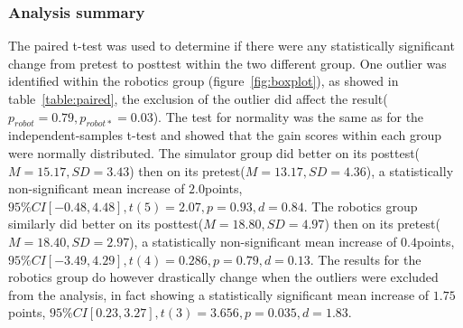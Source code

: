 \subsubsection*{Analysis summary}
The paired t-test was used to determine if there were any statistically significant change from pretest to posttest within the two different group. One outlier was identified within the robotics group (figure~\ref{fig:boxplot}), as showed in table~\ref{table:paired}, the exclusion of the outlier did affect the result($p_{robot} = 0.79, p_{robot*} = 0.03$).
The test for normality was the same as for the independent-samples t-test and showed that the gain scores within each group were normally distributed. 
The simulator group did better on its posttest($M = 15.17, SD = 3.43$) then on its pretest($M = 13.17, SD = 4.36$), a statistically non-significant mean increase of $2.0$points, $95\%CI[-0.48,4.48],t(5)=2.07,p=0.93,d=0.84$.
The robotics group similarly did better on its posttest($M=18.80, SD = 4.97$) then on its pretest($M = 18.40, SD = 2.97$), a statistically non-significant mean increase of $0.4$points, $95\%CI[-3.49,4.29],t(4)=0.286,p=0.79,d=0.13$. The results for the robotics group do however drastically change when the outliers were excluded from the analysis, in fact showing a statistically significant mean increase of $1.75$points, $95\%CI[0.23,3.27],t(3)=3.656,p=0.035,d=1.83$.

